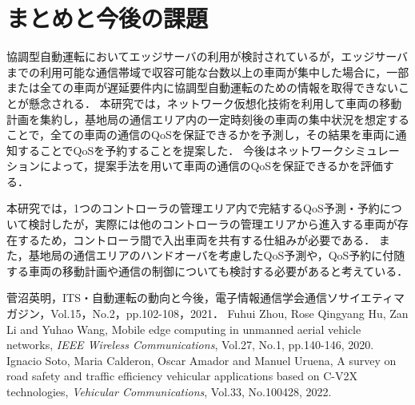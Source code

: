 \documentclass[a4paper,10pt,twocolumn,uplatex]{jsarticle}
\begin{document}
\section{まとめと今後の課題}
協調型自動運転においてエッジサーバの利用が検討されているが，エッジサーバまでの利用可能な通信帯域で収容可能な台数以上の車両が集中した場合に，一部または全ての車両が遅延要件内に協調型自動運転のための情報を取得できないことが懸念される．
本研究では，ネットワーク仮想化技術を利用して車両の移動計画を集約し，基地局の通信エリア内の一定時刻後の車両の集中状況を想定することで，全ての車両の通信のQoSを保証できるかを予測し，その結果を車両に通知することでQoSを予約することを提案した．
今後はネットワークシミュレーションによって，提案手法を用いて車両の通信のQoSを保証できるかを評価する．\par
本研究では，1つのコントローラの管理エリア内で完結するQoS予測・予約について検討したが，実際には他のコントローラの管理エリアから進入する車両が存在するため，コントローラ間で入出車両を共有する仕組みが必要である．
また，基地局の通信エリアのハンドオーバを考慮したQoS予測や，QoS予約に付随する車両の移動計画や通信の制御についても検討する必要があると考えている．

\footnotesize{
  \begin{thebibliography}{99}
     菅沼英明，ITS・自動運転の動向と今後，電子情報通信学会通信ソサイエティマガジン，Vol.15，No.2，pp.102-108，2021．
     Fuhui Zhou, Rose Qingyang Hu, Zan Li and Yuhao Wang, Mobile edge computing in unmanned aerial vehicle networks, \textit{IEEE Wireless Communications}, Vol.27, No.1, pp.140-146, 2020.
     Ignacio Soto, Maria Calderon, Oscar Amador and Manuel Uruena, A survey on road safety and traffic efficiency vehicular applications based on C-V2X technologies, \textit{Vehicular Communications}, Vol.33, No.100428, 2022.
  \end{thebibliography}
}

% 
% 

\end{document}
